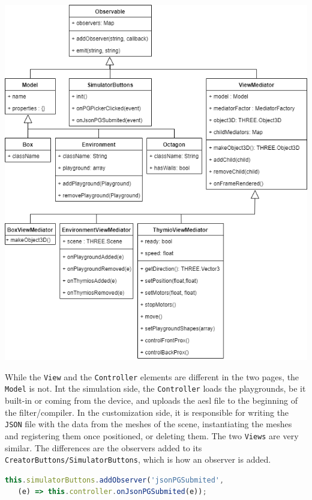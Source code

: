 \documentclass{scrreprt}
\begin{document}
\begin{center}
  \includegraphics[width=\textwidth]{./mvc_cd}
\end{center}

While the \texttt{View} and the \texttt{Controller} elements are different in the two pages, the \texttt{Model} is not. Int the simulation side, the \texttt{Controller} loads the playgrounds, be it built-in or coming from the device, and uploads the aesl file to the beginning of the filter/compiler. 
In the customization side, it is responsible for writing the \texttt{JSON} file with the data from the meshes of the scene,  instantiating the meshes and registering them once positioned, or deleting them. The two \texttt{Views} are very similar. 
The differences are the observers added to its \texttt{CreatorButtons/SimulatorButtons}, which is how an observer is added.

\begin{lstlisting}[language=JavaScript, gobble=2, basicstyle=\ttfamily\small]
  this.simulatorButtons.addObserver('jsonPGSubmited',
   (e) => this.controller.onJsonPGSubmited(e));
\end{lstlisting} 
\end{document}

